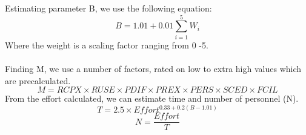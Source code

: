 \documentclass[a4paper,10pt]{article}
\begin{document}
Estimating parameter B, we use the following equation: 
\begin{equation*}
	B = 1.01 + 0.01 \sum_{i=1}^{5} W_{i}
\end{equation*}
Where the weight is a scaling factor ranging from 0 -5. \\\\
Finding M, we use a number of factors, rated on low to extra high values which are precalculated. 
\begin{equation*}
	M = RCPX \times RUSE \times PDIF \times PREX \times PERS \times SCED \times FCIL
\end{equation*}
From the effort calculated, we can estimate time and number of personnel (N). 
\begin{equation*}
	T = 2.5 \times Effort^{0.33 + 0.2(B - 1.01)}
\end{equation*} 
\begin{equation*}
	N = \dfrac{Effort}{T}
\end{equation*}
\newpage
\end{document}
